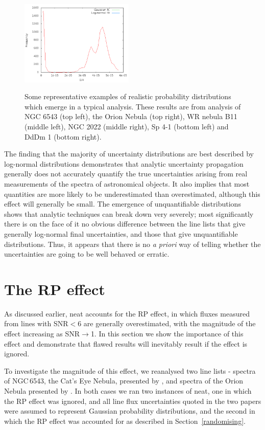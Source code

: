 \documentclass[useAMS,usenatbib]{mn2e}
\begin{document}
\begin{figure}
\includegraphics[width=0.48\textwidth]{figures/plot_binned_DdDm1-3_S_abund_CEL.png}
\label{Typical_uncertainties_images}
\caption{Some representative examples of realistic probability distributions which emerge in a typical analysis.  These results are from analysis of NGC 6543 (top left), the Orion Nebula (top right), WR nebula B11 (middle left), NGC 2022 (middle right), Sp 4-1 (bottom left) and DdDm 1 (bottom right).}
\end{figure}

The finding that the majority of uncertainty distributions are best described by log-normal distributions demonstrates that analytic uncertainty propagation generally does not accurately quantify the true uncertainties arising from real measurements of the spectra of astronomical objects.  It also implies that most quantities are more likely to be underestimated than overestimated, although this effect will generally be small.  The emergence of unquantifiable distributions shows that analytic techniques can break down very severely; most significantly there is on the face of it no obvious difference between the line lists that give generally log-normal final uncertainties, and those that give unquantifiable distributions.  Thus, it appears that there is no {\it a priori} way of telling whether the uncertainties are going to be well behaved or erratic.

\section{The RP effect}

As discussed earlier, {\sc neat} accounts for the RP effect, in which fluxes measured from lines with SNR$<$6 are generally overestimated, with the magnitude of the effect increasing as SNR$\to$1.  In this section we show the importance of this effect and demonstrate that flawed results will inevitably result if the effect is ignored.

To investigate the magnitude of this effect, we reanalysed two line lists - spectra of NGC\,6543, the Cat's Eye Nebula, presented by \citet{2004MNRAS.351.1026W}, and spectra of the Orion Nebula presented by \citet{2004MNRAS.355..229E}.  In both cases we ran two instances of {\sc neat}, one in which the RP effect was ignored, and all line flux uncertainties quoted in the two papers were assumed to represent Gaussian probability distributions, and the second in which the RP effect was accounted for as described in Section~\ref{randomising}.
\end{document}
